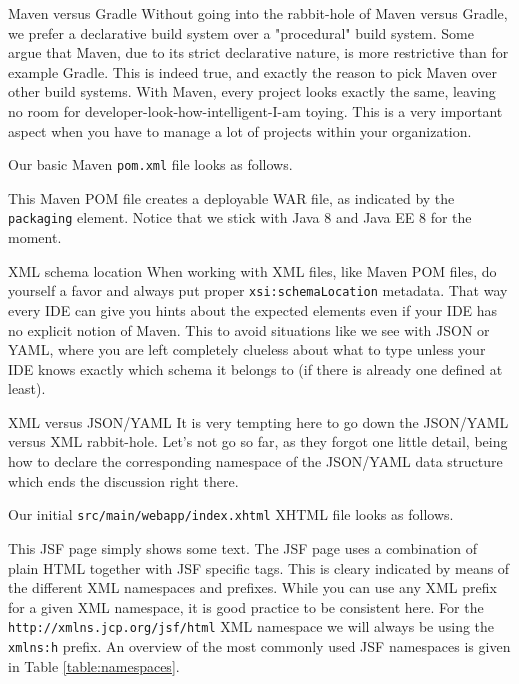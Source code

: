 \begin{ClownComputing}{Maven versus Gradle}
	Without going into the rabbit-hole of Maven versus Gradle, we prefer a declarative build system over a "procedural" build system.
	Some argue that Maven, due to its strict declarative nature, is more restrictive than for example Gradle.
	This is indeed true, and exactly the reason to pick Maven over other build systems.
	With Maven, every project looks exactly the same, leaving no room for developer-look-how-intelligent-I-am toying.
	This is a very important aspect when you have to manage a lot of projects within your organization.
\end{ClownComputing}

Our basic Maven \cite{ApacheMaven} \texttt{pom.xml} file looks as follows.

This Maven POM file creates a deployable WAR file, as indicated by the \texttt{packaging} element.
Notice that we stick with Java 8 \cite{GoslingJoyEtAl14} and Java EE 8 \cite{JavaEE8} for the moment.

\begin{TIP}{XML schema location}
	When working with XML files, like Maven POM files, do yourself a favor and always put proper \texttt{xsi:schemaLocation} metadata.
	That way every IDE can give you hints about the expected elements even if your IDE has no explicit notion of Maven.
	This to avoid situations like we see with JSON or YAML, where you are left completely clueless about what to type unless your IDE knows exactly which schema it belongs to (if there is already one defined at least).
\end{TIP}

\begin{ClownComputing}{XML versus JSON/YAML}
	It is very tempting here to go down the JSON/YAML versus XML rabbit-hole.
	Let's not go so far, as they forgot one little detail, being how to declare the corresponding namespace of the JSON/YAML data structure which ends the discussion right there.
\end{ClownComputing}

Our initial \texttt{src/main/webapp/index.xhtml} XHTML file looks as follows.

This JSF page simply shows some text.
The JSF  page uses a combination of plain HTML together with JSF specific tags.
This is cleary indicated by means of the different XML namespaces and prefixes.
While you can use any XML prefix for a given XML namespace, it is good practice to be consistent here.
For the \texttt{http://xmlns.jcp.org/jsf/html} XML namespace we will always be using the \texttt{xmlns:h} prefix.
An overview of the most commonly used JSF namespaces is given in Table \ref{table:namespaces}.

